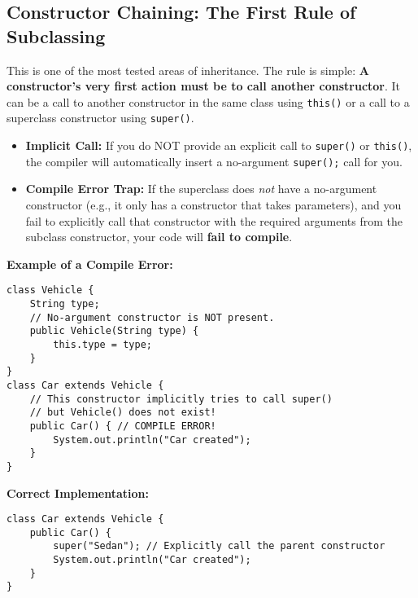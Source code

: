 \documentclass[12pt]{article}
\begin{document}
\begin{enumerate}[label=(\arabic*)]
\subsection{Constructor Chaining: The First Rule of Subclassing}
This is one of the most tested areas of inheritance. The rule is simple: \textbf{A constructor's very first action must be to call another constructor}. It can be a call to another constructor in the same class using \texttt{this()} or a call to a superclass constructor using \texttt{super()}.
\begin{itemize}
    \item \textbf{Implicit Call:} If you do NOT provide an explicit call to \texttt{super()} or \texttt{this()}, the compiler will automatically insert a no-argument \texttt{super();} call for you.
    \item \textbf{Compile Error Trap:} If the superclass does \textit{not} have a no-argument constructor (e.g., it only has a constructor that takes parameters), and you fail to explicitly call that constructor with the required arguments from the subclass constructor, your code will \textbf{fail to compile}.
\end{itemize}
\textbf{Example of a Compile Error:}
\begin{verbatim}
class Vehicle {
    String type;
    // No-argument constructor is NOT present.
    public Vehicle(String type) {
        this.type = type;
    }
}
class Car extends Vehicle {
    // This constructor implicitly tries to call super()
    // but Vehicle() does not exist!
    public Car() { // COMPILE ERROR!
        System.out.println("Car created");
    }
}
\end{verbatim}
\textbf{Correct Implementation:}
\begin{verbatim}
class Car extends Vehicle {
    public Car() {
        super("Sedan"); // Explicitly call the parent constructor
        System.out.println("Car created");
    }
}
\end{verbatim}


\end{enumerate}
\end{document}
